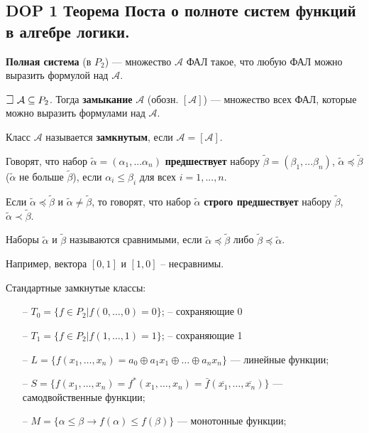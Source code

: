 \subsection{DOP 1 Теорема Поста о полноте систем функций в алгебре логики.}


\textbf{Полная система} (в $P_2$) --- множество $\mathcal{A}$ ФАЛ такое, что любую ФАЛ можно выразить формулой над $\mathcal{A}$.

$\mathLet ~ \mathcal{A} \subseteq P_2$. Тогда \textbf{замыкание} $\mathcal{A}$ (обозн. $[\mathcal{A}]$) --- множество всех ФАЛ, которые можно выразить формулами над $\mathcal{A}$.

Класс $\mathcal{A}$ называется \textbf{замкнутым}, если $\mathcal{A} = [\mathcal{A}]$.

Говорят, что набор $\tilde{\alpha} = (\alpha_1, ... \alpha_n)$ \textbf{предшествует} набору $\tilde{\beta} = (\beta_1, ... \beta_n)$,  $\tilde{\alpha} \preccurlyeq \tilde{\beta}$ ($\tilde{\alpha}$ не больше $\tilde{\beta}$), если $\alpha_i \leqslant \beta_i$ для всех $i = 1, ..., n$.

Если $\tilde{\alpha} \preccurlyeq \tilde{\beta}$ и $\tilde{\alpha} \neq \tilde{\beta}$, то говорят, что набор $\tilde{\alpha}$ \textbf{строго предшествует} набору $\tilde{\beta}$, $\tilde{\alpha} \prec \tilde{\beta}$.

Наборы $\tilde{\alpha}$ и $\tilde{\beta}$ называются сравнимыми, если $\tilde{\alpha} \preccurlyeq \tilde{\beta}$ либо $\tilde{\beta} \preccurlyeq \tilde{\alpha}$.

Например, вектора $[0, 1]$ и $[1, 0]$ -- несравнимы.

Стандартные замкнутые классы:
\begin{itemize}
    \item[--] $T_0 = \{f \in P_2 | f(0, \dots, 0) = 0\}$; -- сохраняющие 0
    \item[--] $T_1 = \{f \in P_2 | f(1, \dots, 1) = 1\}$; -- сохраняющие 1
    \item[--] $L = \{f(x_1, \dots, x_n) = a_0 \oplus a_1 x_1 \oplus \dots \oplus a_n x_n\}$ --- линейные функции;
    \item[--] $S = \{f(x_1, \dots, x_n) = f^*(x_1, \dots, x_n) = \bar{f}(\overline{x_1}, \dots, \overline{x_n})\}$ --- самодвойственные функции;
    \item[--] $M = \{\alpha \leqslant \beta \rightarrow f(\alpha) \leqslant f(\beta)\}$ --- монотонные функции;
\end{itemize}

